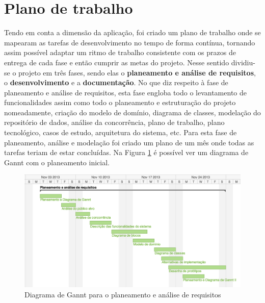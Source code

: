 \section{Plano de trabalho}
Tendo em conta a dimensão da aplicação, foi criado um plano de trabalho onde se mapearam as tarefas
de desenvolvimento no tempo de forma contínua, tornando assim possível adaptar um ritmo de trabalho
consistente com os prazos de entrega de cada fase e então cumprir as metas do projeto.
Nesse sentido dividiu-se o projeto em três fases, sendo elas o \textbf{planeamento e análise de requisitos}, o
\textbf{desenvolvimento} e a \textbf{documentação}.
No que diz respeito à fase de planeamento e análise de requisitos, esta fase engloba todo o levantamento 
de funcionalidades assim como todo o planeamento e estruturação do projeto 
nomeadamente, criação do modelo de domínio, diagrama de classes, modelação do repositório de dados,
análise da concorrência, plano de trabalho, plano tecnológico, casos de estudo, arquitetura do sistema, etc.
Para esta fase de planeamento, análise e modelação foi criado um plano de um mês onde todas as tarefas 
teriam de estar concluídas. Na Figura \ref{fig: workplan1} é possível ver um diagrama de Gannt com
o planeamento inicial.

\begin{figure}[H] 
  \centering
  \includegraphics[width=1\textwidth]{images/plano_de_trabalho/gannt_1.png}
  \caption{Diagrama de Gannt para o planeamento e análise de requisitos}
  \label{fig: workplan1}
\end{figure}

